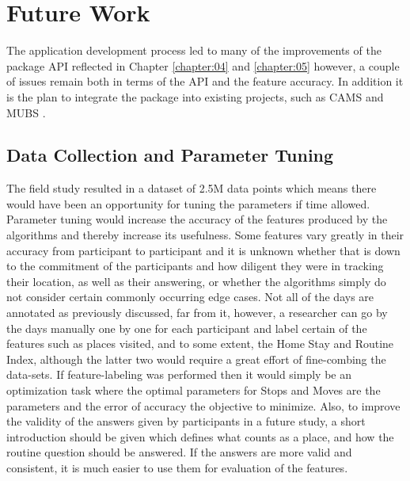 \section{Future Work}
The application development process led to many of the improvements of the package API reflected in Chapter \ref{chapter:04} and \ref{chapter:05} however, a couple of issues remain both in terms of the API and the feature accuracy. In addition it is the plan to integrate the package into existing projects, such as CAMS \cite{CAMS} and MUBS \cite{mubs-rohani}.

\subsection{Data Collection and Parameter Tuning}
The field study resulted in a dataset of 2.5M data points which means there would have been an opportunity for tuning the parameters if time allowed. Parameter tuning would increase the accuracy of the features produced by the algorithms and thereby increase its usefulness. Some features vary greatly in their accuracy from participant to participant and it is unknown whether that is down to the commitment of the participants and how diligent they were in tracking their location, as well as their answering, or whether the algorithms simply do not consider certain commonly occurring edge cases. Not all of the days are annotated as previously discussed, far from it, however, a researcher can go by the days manually one by one for each participant and label certain of the features such as places visited, and to some extent, the Home Stay and Routine Index, although the latter two would require a great effort of fine-combing the data-sets. If feature-labeling was performed then it would simply be an optimization task where the optimal parameters for Stops and Moves are the parameters and the error of accuracy the objective to minimize. Also, to improve the validity of the answers given by participants in a future study, a short introduction should be given which defines what counts as a place, and how the routine question should be answered. If the answers are more valid and consistent, it is much easier to use them for evaluation of the features.

